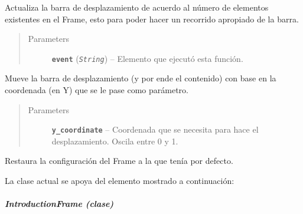 \documentclass[letterpaper,10pt,english]{sphinxmanual}
\begin{document}
\begin{fulllineitems}
\begin{fulllineitems}
Actualiza la barra de desplazamiento de acuerdo al número de elementos
existentes en el Frame, esto para poder hacer un recorrido apropiado de 
la barra.
\begin{quote}\begin{description}
\item[{Parameters}] \leavevmode
\textbf{\texttt{event}} (\emph{\texttt{String}}) -- Elemento que ejecutó esta función.

\end{description}\end{quote}

\end{fulllineitems}


\begin{fulllineitems}
\label{View/Main/Home/HomeFrame:View.Main.Home.HomeFrame.HomeFrame.move_to_section}
Mueve la barra de desplazamiento (y por ende el contenido)
con base en la coordenada (en Y) que se le pase como parámetro.
\begin{quote}\begin{description}
\item[{Parameters}] \leavevmode
\textbf{\texttt{y\_coordinate}} -- Coordenada que se necesita para hace el
desplazamiento. Oscila entre 0 y 1.

\end{description}\end{quote}

\end{fulllineitems}


\begin{fulllineitems}
\label{View/Main/Home/HomeFrame:View.Main.Home.HomeFrame.HomeFrame.restore_settings}
Restaura la configuración del Frame a la que tenía por
defecto.

\end{fulllineitems}


\end{fulllineitems}


La clase actual se apoya del elemento mostrado a continuación:


\subparagraph{IntroductionFrame (clase)}
\label{View/Main/Home/IntroductionFrame:module-View.Main.Home.IntroductionFrame}\label{View/Main/Home/IntroductionFrame::doc}\label{View/Main/Home/IntroductionFrame:introductionframe-clase}
\end{document}
